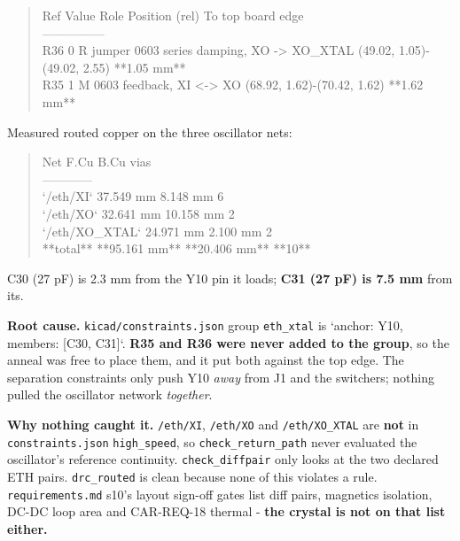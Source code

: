 \documentclass[11pt,a4paper]{article}
\begin{document}
\begin{quote}\small\ttfamily\raggedright
\textbar{} Ref \textbar{} Value \textbar{} Role \textbar{} Position (rel) \textbar{} To top board edge \textbar{}\\
\textbar{}---\textbar{}---\textbar{}---\textbar{}---\textbar{}---\textbar{}\\
\textbar{} R36 \textbar{} 0 R jumper 0603 \textbar{} series damping, XO -\textgreater{} XO\_XTAL \textbar{} (49.02, 1.05)-(49.02, 2.55) \textbar{} {*}{*}1.05 mm{*}{*} \textbar{}\\
\textbar{} R35 \textbar{} 1 M 0603 \textbar{} feedback, XI \textless{}-\textgreater{} XO \textbar{} (68.92, 1.62)-(70.42, 1.62) \textbar{} {*}{*}1.62 mm{*}{*} \textbar{}
\end{quote}
Measured routed copper on the three oscillator nets:

\begin{quote}\small\ttfamily\raggedright
\textbar{} Net \textbar{} F.Cu \textbar{} B.Cu \textbar{} vias \textbar{}\\
\textbar{}---\textbar{}---\textbar{}---\textbar{}---\textbar{}\\
\textbar{} `/eth/XI` \textbar{} 37.549 mm \textbar{} 8.148 mm \textbar{} 6 \textbar{}\\
\textbar{} `/eth/XO` \textbar{} 32.641 mm \textbar{} 10.158 mm \textbar{} 2 \textbar{}\\
\textbar{} `/eth/XO\_XTAL` \textbar{} 24.971 mm \textbar{} 2.100 mm \textbar{} 2 \textbar{}\\
\textbar{} {*}{*}total{*}{*} \textbar{} {*}{*}95.161 mm{*}{*} \textbar{} {*}{*}20.406 mm{*}{*} \textbar{} {*}{*}10{*}{*} \textbar{}
\end{quote}
C30 (27 pF) is 2.3 mm from the Y10 pin it loads; \textbf{C31 (27 pF) is 7.5 mm} from its.

\textbf{Root cause.} \texttt{kicad/constraints.json} group \texttt{eth\_xtal} is `anchor: Y10, members: {[}C30, C31{]}`. \textbf{R35 and R36 were never added to the group}, so the anneal was free to place them, and it put both against the top edge. The separation constraints only push Y10 \emph{away} from J1 and the switchers; nothing pulled the oscillator network \emph{together}.

\textbf{Why nothing caught it.} \texttt{/eth/XI}, \texttt{/eth/XO} and \texttt{/eth/XO\_XTAL} are \textbf{not} in \texttt{constraints.json} \texttt{high\_speed}, so \texttt{check\_return\_path} never evaluated the oscillator's reference continuity. \texttt{check\_diffpair} only looks at the two declared ETH pairs. \texttt{drc\_routed} is clean because none of this violates a rule. \texttt{requirements.md} s10's layout sign-off gates list diff pairs, magnetics isolation, DC-DC loop area and CAR-REQ-18 thermal - \textbf{the crystal is not on that list either.}
\end{document}
